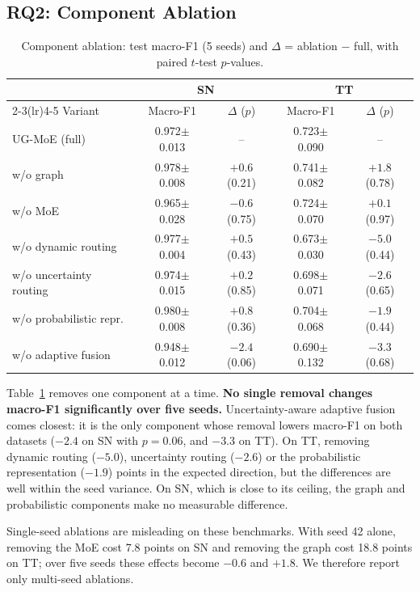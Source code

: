 \documentclass[journal]{IEEEtran}
\newcommand{\sd}[1]{{\scriptsize$\pm$#1}}
\newcommand{\ugmoe}{UG-MoE}
\begin{document}
\subsection{RQ2: Component Ablation}

\begin{table}[!t]
\caption{Component ablation: test macro-F1 (5 seeds) and $\Delta$ = ablation $-$ full, with paired $t$-test $p$-values.}
\label{tab:ablation}
\centering
\footnotesize
\setlength{\tabcolsep}{2.6pt}
\begin{tabular}{@{}lcccc@{}}
\toprule
& \multicolumn{2}{c}{SN} & \multicolumn{2}{c}{TT} \\
\cmidrule(lr){2-3}\cmidrule(lr){4-5}
Variant & Macro-F1 & $\Delta$ ($p$) & Macro-F1 & $\Delta$ ($p$) \\
\midrule
\ugmoe{} (full) & 0.972\sd{0.013} & -- & 0.723\sd{0.090} & -- \\
w/o graph & 0.978\sd{0.008} & $+0.6$ (0.21) & 0.741\sd{0.082} & $+1.8$ (0.78) \\
w/o MoE & 0.965\sd{0.028} & $-0.6$ (0.75) & 0.724\sd{0.070} & $+0.1$ (0.97) \\
w/o dynamic routing & 0.977\sd{0.004} & $+0.5$ (0.43) & 0.673\sd{0.030} & $-5.0$ (0.44) \\
w/o uncertainty routing & 0.974\sd{0.015} & $+0.2$ (0.85) & 0.698\sd{0.071} & $-2.6$ (0.65) \\
w/o probabilistic repr. & 0.980\sd{0.008} & $+0.8$ (0.36) & 0.704\sd{0.068} & $-1.9$ (0.44) \\
w/o adaptive fusion & 0.948\sd{0.012} & $\bm{-2.4}$ (0.06) & 0.690\sd{0.132} & $\bm{-3.3}$ (0.68) \\
\bottomrule
\end{tabular}
\end{table}

Table~\ref{tab:ablation} removes one component at a time. \textbf{No single removal changes macro-F1
significantly over five seeds.} Uncertainty-aware adaptive fusion comes closest: it is the only component
whose removal lowers macro-F1 on both datasets ($-2.4$ on SN with $p=0.06$, and $-3.3$ on TT). On TT, removing
dynamic routing ($-5.0$), uncertainty routing ($-2.6$) or the probabilistic representation ($-1.9$) points in
the expected direction, but the differences are well within the seed variance. On SN, which is close to
its ceiling, the graph and probabilistic components make no measurable difference.

Single-seed ablations are misleading on these benchmarks. With seed 42 alone, removing the MoE cost 7.8
points on SN and removing the graph cost 18.8 points on TT; over five seeds these effects become $-0.6$ and
$+1.8$. We therefore report only multi-seed ablations.
\end{document}
